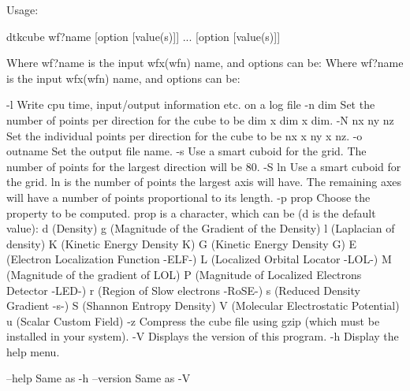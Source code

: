 Usage:

	dtkcube wf?name [option [value(s)]] ... [option [value(s)]]

Where wf?name is the input wfx(wfn) name, and options can be:
Where wf?name is the input wfx(wfn) name, and options can be:

  -l        	Write cpu time, input/output information etc. on a log file
  -n  dim   	Set the number of points per direction for the cube
            	  to be dim x dim x dim.
  -N nx ny nz	Set the individual points per direction for the cube
            	  to be nx x ny x nz.
  -o outname	Set the output file name.
  -s        	Use a smart cuboid for the grid. The number of points for the
            	  largest direction will be 80.
  -S ln     	Use a smart cuboid for the grid. ln is the number of points
            	  the largest axis will have. The remaining axes will have
            	  a number of points proportional to its length.
  -p prop	Choose the property to be computed. prop is a character,
         	  which can be (d is the default value): 
         		d (Density)
         		g (Magnitude of the Gradient of the Density)
         		l (Laplacian of density)
         		K (Kinetic Energy Density K)
         		G (Kinetic Energy Density G)
         		E (Electron Localization Function -ELF-)
         		L (Localized Orbital Locator -LOL-)
         		M (Magnitude of the gradient of LOL)
         		P (Magnitude of Localized Electrons Detector -LED-)
         		r (Region of Slow electrons -RoSE-)
         		s (Reduced Density Gradient -s-)
         		S (Shannon Entropy Density)
         		V (Molecular Electrostatic Potential)
         		u (Scalar Custom Field)
  -z     	Compress the cube file using gzip (which must be installed
         	   in your system).
  -V        	Displays the version of this program.
  -h		Display the help menu.

  --help    		Same as -h
  --version 		Same as -V
